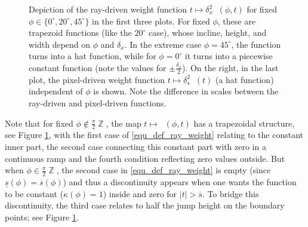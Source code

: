 \documentclass[11pt,reqno]{amsart}
\DeclareMathOperator{\ZZ}{\mathbb{Z}}
\DeclareMathOperator{\RayWeight}{\omega^\mathrm{rd}_{\delta_\mathit{x}}}
\DeclareMathOperator{\PixelWeight}{\omega^\mathrm{pd}_{\delta_\mathit{s}}}
\numberwithin{theorem}{section}
\theoremstyle{remark}
\begin{document}
\begin{figure}

\caption{Depiction of the ray-driven weight function $t\mapsto \delta_x^2\RayWeight(\phi,t)$ for fixed $\phi\in \{0^\circ,20^\circ,45^\circ\}$ in the first three plots. For fixed $\phi$, these are trapezoid functions (like the $20^\circ$ case), whose incline, height, and width depend on $\phi$ and $\delta_x$. In the extreme case $\phi=45^\circ$, the function turns into a hat function, while for $\phi=0^\circ$ it turns into a piecewise constant function (note the values for $\pm \frac{\delta_x}{2}$). On the right, in the last plot, the pixel-driven weight function $t\mapsto \delta_s^2\PixelWeight(t)$ (a hat function) independent of $\phi$ is shown. Note the difference in scales between the ray-driven and pixel-driven functions.}
\label{Fig_graphs_ray_driven}

\end{figure}
Note that for fixed $\phi\not \in  \frac{\pi}{2}\ZZ$, the map $t\mapsto \RayWeight(\phi,t)$ has a trapezoidal structure, see Figure \ref{Fig_graphs_ray_driven}, with the first case of \eqref{equ_def_ray_weight} relating to the constant inner part, the second case connecting this constant part with zero in a continuous ramp and the fourth condition reflecting zero values outside.
But when $\phi\in  \frac{\pi}{2}\ZZ$, the second case in \eqref{equ_def_ray_weight} is empty (since $\underline s(\phi)=\overline s(\phi)$) and thus a discontinuity appears when one wants the function to be constant ($\kappa(\phi)=1$) inside and zero for $|t|>\overline s$. To bridge this discontinuity, the third case relates to half the jump height on the boundary points; see Figure \ref{Fig_graphs_ray_driven}.
\end{document}
